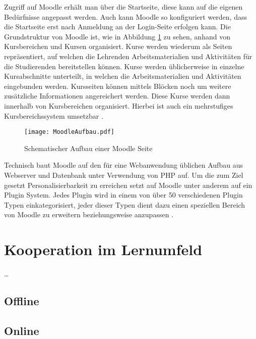 Zugriff auf Moodle erhält man über die Startseite, diese kann auf die eigenen Bedürfnisse angepasst werden. Auch kann Moodle so konfiguriert werden, dass die Startseite erst nach Anmeldung an der Login-Seite erfolgen kann. Die Grundstruktur von Moodle ist, wie in Abbildung \ref{fig:MoodleAufbau} zu sehen, anhand von Kursbereichen und Kursen organisiert. Kurse werden wiederum als Seiten repräsentiert, auf welchen die Lehrenden Arbeitsmaterialien und Aktivitäten für die Studierenden bereitstellen können. Kurse werden üblicherweise in einzelne Kursabschnitte unterteilt, in welchen die Arbeitsmaterialien und Aktivitäten eingebunden werden. Kursseiten können mittels Blöcken noch um weitere zusätzliche Informationen angereichert werden. Diese Kurse werden dann innerhalb von Kursbereichen organisiert. Hierbei ist auch ein mehrstufiges Kursbereichssystem umsetzbar \citep{moodle2015aufbau}.

\begin{figure}[h!]
\texttt{[image: MoodleAufbau.pdf]}
\caption{\label{fig:MoodleAufbau}Schematischer Aufbau einer Moodle Seite}
\end{figure}

Technisch baut Moodle auf den für eine Webanwendung üblichen Aufbau aus Webserver und Datenbank unter Verwendung von PHP auf. Um die zum Ziel gesetzt Personalisierbarkeit zu erreichen setzt auf Moodle unter anderem auf ein Plugin System. Jedes Plugin wird in einem von über 50 verschiedenen Plugin Typen einkategorisiert, jeder dieser Typen dient dazu einen speziellen Bereich von Moodle zu erweitern beziehungsweise anzupassen \citep{moodle2017plugin}.


\section{Kooperation im Lernumfeld}
\dots

\subsection{Offline}

\subsection{Online}


